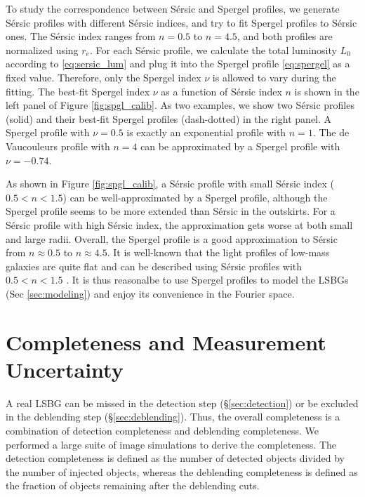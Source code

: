\documentclass[twocolumn,astrosymb,twocolappendix]{aastex631}
\newcommand{\sersic}{S\'ersic}
\begin{document}
\begin{CJK*}{UTF8}{gbsn}
To study the correspondence between \sersic{} and Spergel profiles, we generate \sersic{} profiles with different \sersic{} indices, and try to fit Spergel profiles to \sersic{} ones. The \sersic{} index ranges from $n=0.5$ to $n=4.5$, and both profiles are normalized using $r_e$. For each \sersic{} profile, we calculate the total luminosity $L_0$ according to \eqref{eq:sersic_lum} and plug it into the Spergel profile \eqref{eq:spergel} as a fixed value. Therefore, only the Spergel index $\nu$ is allowed to vary during the fitting. The best-fit Spergel index $\nu$ as a function of \sersic{} index $n$ is shown in the left panel of Figure \ref{fig:spgl_calib}. As two examples, we show two \sersic{} profiles (solid) and their best-fit Spergel profiles (dash-dotted) in the right panel. A Spergel profile with $\nu=0.5$ is exactly an exponential profile with $n=1$. The de Vaucouleurs profile \citep{deVaucouleurs1948} with $n=4$ can be approximated by a Spergel profile with $\nu=-0.74$. 

As shown in Figure \ref{fig:spgl_calib}, a \sersic{} profile with small \sersic{} index ($0.5 < n < 1.5$) can be well-approximated by a Spergel profile, although the Spergel profile seems to be more extended than \sersic{} in the outskirts. For a \sersic{} profile with high \sersic{} index, the approximation gets worse at both small and large radii. Overall, the Spergel profile is a good approximation to \sersic{} from $n\approx 0.5$ to $n\approx 4.5$. It is well-known that the light profiles of low-mass galaxies are quite flat and can be described using \sersic{} profiles with $0.5 < n < 1.5$ \citep[e.g.,][]{vanDokkum2015,Lange2015,Greco2018,Zaritsky2021,ELVES-I}. It is thus reasonalbe to use Spergel profiles to model the LSBGs (Sec \ref{sec:modeling}) and enjoy its convenience in the Fourier space. 

\section{Completeness and Measurement Uncertainty}\label{ap:comp_meas_unc}
A real LSBG can be missed in the detection step (\S \ref{sec:detection}) or be excluded in the deblending step (\S \ref{sec:deblending}). Thus, the overall completeness is a combination of detection completeness and deblending completeness. We performed a large suite of image simulations to derive the completeness. The detection completeness is defined as the number of detected objects divided by the number of injected objects, whereas the deblending completeness is defined as the fraction of objects remaining after the deblending cuts. 


\end{CJK*}
\end{document}
